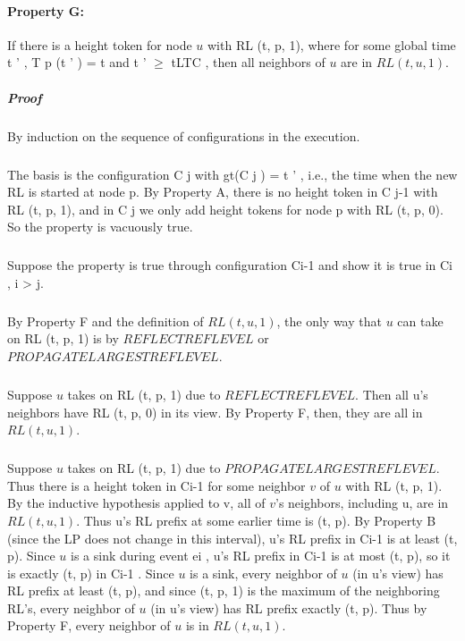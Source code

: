 \paragraph{Property G:} If there is a height token for node $u$ with RL (t, p, 1), where for some global time t ' , T p (t ' ) = t and t ' $\geq$ tLTC , then all neighbors of $u$ are in $RL (t, u, 1)$.
\subparagraph{Proof} By induction on the sequence of configurations in the execution.
\subparagraph{}The basis is the configuration C j with gt(C j ) = t ' , i.e., the time when the new RL is started at node p. By Property A, there is no height token in C j-1 with RL (t, p, 1), and in C j we only add height tokens for node p with RL (t, p, 0). So the property is vacuously true.
\subparagraph{}Suppose the property is true through configuration Ci-1 and show it is true in Ci , i > j.
\subparagraph{}By Property F and the definition of $RL (t, u, 1)$, the only way that $u$ can take on RL (t, p, 1) is by $REFLECTREFLEVEL$ or $PROPAGATELARGESTREFLEVEL$.
\subparagraph{}Suppose $u$ takes on RL (t, p, 1) due to $REFLECTREFLEVEL$. Then all u's neighbors have RL (t, p, 0) in its view. By Property F, then, they are all in $RL (t, u, 1)$.
\subparagraph{}Suppose $u$ takes on RL (t, p, 1) due to $PROPAGATELARGESTREFLEVEL$. Thus there is a height token in Ci-1 for some neighbor $v$ of $u$ with RL (t, p, 1). By the inductive hypothesis applied to v, all of $v$'s neighbors, including u, are in $RL (t, u, 1)$. Thus u's RL prefix at some earlier time is (t, p). By Property B (since the LP does not change in this interval), u's RL prefix in Ci-1 is at least (t, p). Since $u$ is a sink during event ei , u's RL prefix in Ci-1 is at most (t, p), so it is exactly (t, p) in Ci-1 . Since $u$ is a sink, every neighbor of $u$ (in u's view) has RL prefix at least (t, p), and since (t, p, 1) is the maximum of the neighboring RL's, every neighbor of $u$ (in u's view) has RL prefix exactly (t, p). Thus by Property F, every neighbor of $u$ is in $RL (t, u, 1)$.

